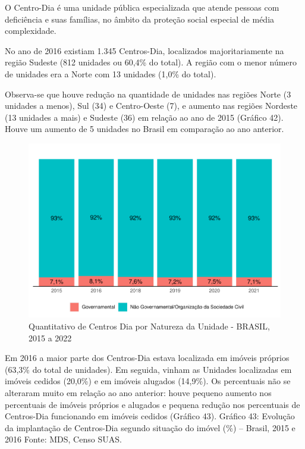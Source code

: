 \documentclass[
  brazilian]{report}
\begin{document}
O Centro-Dia é uma unidade pública especializada que atende pessoas com
deficiência e suas famílias, no âmbito da proteção social especial de
média complexidade.

No ano de 2016 existiam 1.345 Centros-Dia, localizados majoritariamente
na região Sudeste (812 unidades ou 60,4\% do total). A região com o
menor número de unidades era a Norte com 13 unidades (1,0\% do total).

Observa-se que houve redução na quantidade de unidades nas regiões Norte
(3 unidades a menos), Sul (34) e Centro-Oeste (7), e aumento nas regiões
Nordeste (13 unidades a mais) e Sudeste (36) em relação ao ano de 2015
(Gráfico 42). Houve um aumento de 5 unidades no Brasil em comparação ao
ano anterior.

\begin{figure}
\includegraphics{Censo-SUAS-2022_files/figure-latex/cdia-natureza-1} \caption[Quantitativo de Centros Dia por Natureza da Unidade - BRASIL, 2015 a 2022]{Quantitativo de Centros Dia por Natureza da Unidade - BRASIL, 2015 a 2022}\label{fig:cdia-natureza}
\end{figure}

Em 2016 a maior parte dos Centros-Dia estava localizada em imóveis
próprios (63,3\% do total de unidades). Em seguida, vinham as Unidades
localizadas em imóveis cedidos (20,0\%) e em imóveis alugados (14,9\%).
Os percentuais não se alteraram muito em relação ao ano anterior: houve
pequeno aumento nos percentuais de imóveis próprios e alugados e pequena
redução nos percentuais de Centros-Dia funcionando em imóveis cedidos
(Gráfico 43). Gráfico 43: Evolução da implantação de Centros-Dia segundo
situação do imóvel (\%) -- Brasil, 2015 e 2016 Fonte: MDS, Censo SUAS.
\end{document}
